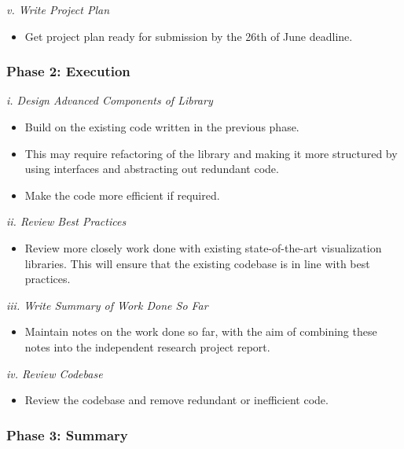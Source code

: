 \documentclass[12pt]{article}
\begin{document}
\textit{v. Write Project Plan}

\begin{itemize}
	\item Get project plan ready for submission by the 26th of June deadline.
\end{itemize}

\subsubsection{Phase 2: Execution}

\textit{i. Design Advanced Components of Library}


\begin{itemize}
	
\item Build on the existing code written in the previous phase. 
\item This may require refactoring of the library and making it more structured by using interfaces and abstracting out redundant code.
\item Make the code more efficient if required.

\end{itemize}

\textit{ii. Review Best Practices}

\begin{itemize}
\item Review more closely work done with existing state-of-the-art visualization libraries. This will ensure that the existing codebase is in line with best practices.
\end{itemize}

\textit{iii. Write Summary of Work Done So Far}

\begin{itemize}
\item Maintain notes on the work done so far, with the aim of combining these notes into the independent research project report.
\end{itemize}

\textit{iv. Review Codebase}

\begin{itemize}
\item Review the codebase and remove redundant or inefficient code. 
\end{itemize}

\subsubsection{Phase 3: Summary}
\end{document}
